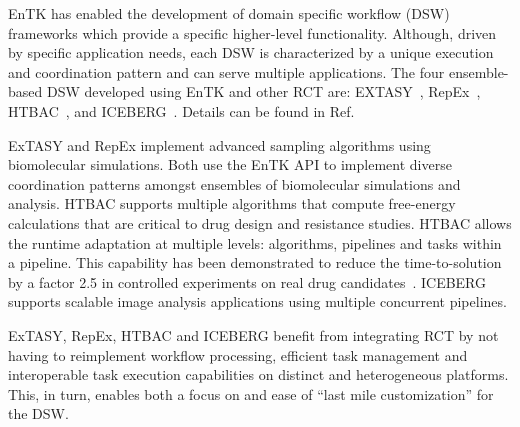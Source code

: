 \documentclass[preprint,12pt, a4paper]{elsarticle}
\begin{document}
EnTK has enabled the development of domain specific workflow (DSW) frameworks
which provide a specific higher-level functionality. Although, driven by
specific application needs, each DSW is characterized by a unique execution
and coordination pattern and can serve multiple applications. The four
ensemble-based DSW developed using EnTK and other RCT are:
EXTASY~\cite{balasubraman,ian2016extasy}, RepEx~\cite{treikalis2016repex},
HTBAC~\cite{dakka2018high}, and ICEBERG~\cite{}. Details can be found in
Ref.~\citep{}  %




ExTASY and RepEx implement advanced sampling algorithms using biomolecular
simulations. Both use the EnTK API to implement  diverse coordination
patterns amongst ensembles of biomolecular simulations and analysis. HTBAC
supports multiple algorithms that compute free-energy calculations that are
critical to drug design and resistance studies. HTBAC allows the runtime
adaptation at multiple levels: algorithms, pipelines and tasks within a
pipeline. This capability has been demonstrated to reduce the
time-to-solution by a factor 2.5 in controlled experiments on real drug
candidates~\citep{}. ICEBERG supports scalable image analysis applications
using multiple concurrent pipelines.

ExTASY, RepEx, HTBAC and ICEBERG benefit from integrating RCT by not having
to reimplement workflow processing, efficient task management and
interoperable task execution capabilities on distinct and heterogeneous
platforms. This, in turn, enables both a focus on and ease of ``last mile
customization'' for the DSW\@.
\end{document}
